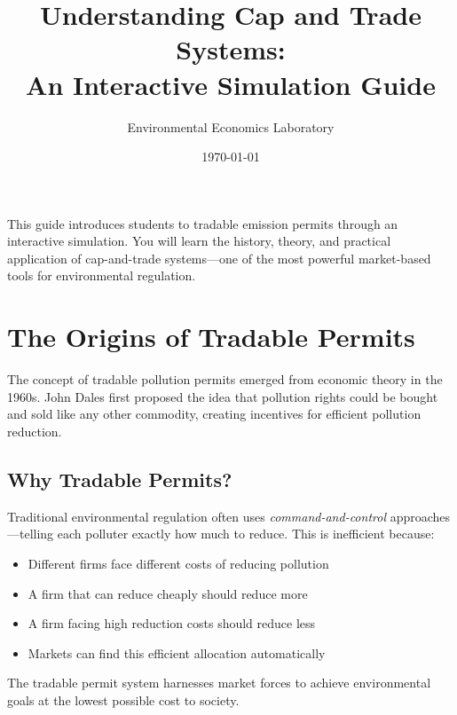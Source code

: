 \documentclass{tufte-handout}\usepackage[]{graphicx}\usepackage[]{xcolor}
\title{Understanding Cap and Trade Systems:\\ An Interactive Simulation Guide}
\author{Environmental Economics Laboratory}
\date{\today}
\begin{document}
\maketitle


\noindent This guide introduces students to tradable emission permits through an interactive simulation. You will learn the history, theory, and practical application of cap-and-trade systems---one of the most powerful market-based tools for environmental regulation.


\section{The Origins of Tradable Permits}

The concept of tradable pollution permits emerged from economic theory in the 1960s. John Dales first proposed the idea that pollution rights could be bought and sold like any other commodity, creating incentives for efficient pollution reduction.

\subsection{Why Tradable Permits?}

Traditional environmental regulation often uses \textit{command-and-control} approaches---telling each polluter exactly how much to reduce. This is inefficient because:

\begin{itemize}
\item Different firms face different costs of reducing pollution
\item A firm that can reduce cheaply should reduce more
\item A firm facing high reduction costs should reduce less
\item Markets can find this efficient allocation automatically
\end{itemize}


The tradable permit system harnesses market forces to achieve environmental goals at the lowest possible cost to society.
\end{document}
